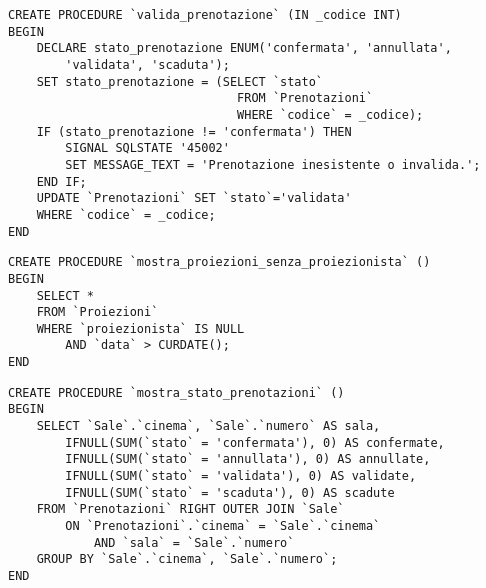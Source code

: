 \pagebreak
\begin{verbatim}
CREATE PROCEDURE `valida_prenotazione` (IN _codice INT)
BEGIN
    DECLARE stato_prenotazione ENUM('confermata', 'annullata',
        'validata', 'scaduta');
    SET stato_prenotazione = (SELECT `stato`
                                FROM `Prenotazioni`
                                WHERE `codice` = _codice);
    IF (stato_prenotazione != 'confermata') THEN
        SIGNAL SQLSTATE '45002'
        SET MESSAGE_TEXT = 'Prenotazione inesistente o invalida.';
    END IF;
    UPDATE `Prenotazioni` SET `stato`='validata'
    WHERE `codice` = _codice;
END
\end{verbatim}

\begin{verbatim}
CREATE PROCEDURE `mostra_proiezioni_senza_proiezionista` ()
BEGIN
    SELECT *
    FROM `Proiezioni`
    WHERE `proiezionista` IS NULL
        AND `data` > CURDATE();
END
\end{verbatim}

\begin{verbatim}
CREATE PROCEDURE `mostra_stato_prenotazioni` ()
BEGIN
    SELECT `Sale`.`cinema`, `Sale`.`numero` AS sala,
        IFNULL(SUM(`stato` = 'confermata'), 0) AS confermate,
        IFNULL(SUM(`stato` = 'annullata'), 0) AS annullate,
        IFNULL(SUM(`stato` = 'validata'), 0) AS validate,
        IFNULL(SUM(`stato` = 'scaduta'), 0) AS scadute
    FROM `Prenotazioni` RIGHT OUTER JOIN `Sale`
        ON `Prenotazioni`.`cinema` = `Sale`.`cinema`
            AND `sala` = `Sale`.`numero`
    GROUP BY `Sale`.`cinema`, `Sale`.`numero`;
END
\end{verbatim}
